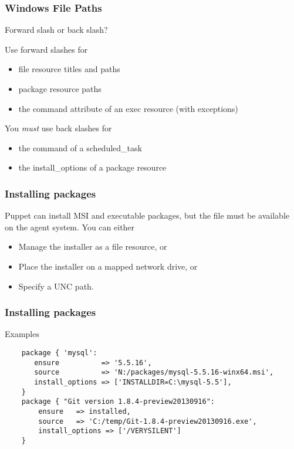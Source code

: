 \documentclass[10pt]{beamer}
\begin{document}
\begin{frame}
  \frametitle{Windows File Paths}
  
Forward slash or back slash?

Use forward slashes for 
\begin{itemize}
\item file resource titles and paths
\item package resource paths
\item the command attribute of an exec resource (with exceptions)
\end{itemize}

You \emph{must} use back slashes for 
\begin{itemize}
\item the command of a scheduled\_task
\item the install\_options of a package resource
\end{itemize}


\end{frame}

\begin{frame}
  \frametitle{Installing packages}
  
Puppet can install MSI and executable packages, but the file must be available on the agent system.  You can either
\begin{itemize}
\item Manage the installer as a file resource, or
\item Place the installer on a mapped network drive, or
\item Specify a UNC path.
\end{itemize}
\end{frame}
\begin{frame}[fragile]
  \frametitle{Installing packages}
  Examples

  \begin{verbatim}
    package { 'mysql':
       ensure          => '5.5.16',
       source          => 'N:/packages/mysql-5.5.16-winx64.msi',
       install_options => ['INSTALLDIR=C:\mysql-5.5'],
    }
    package { "Git version 1.8.4-preview20130916":
        ensure   => installed,
        source   => 'C:/temp/Git-1.8.4-preview20130916.exe',
        install_options => ['/VERYSILENT']
    }
  \end{verbatim}



\end{frame}
\end{document}
